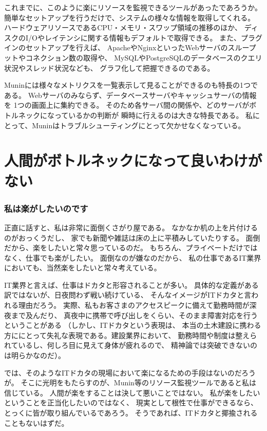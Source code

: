 これまでに、このように楽にリソースを監視できるツールがあったであろうか。
簡単なセットアップを行うだけで、システムの様々な情報を取得してくれる。
ハードウェアリソースであるCPU・メモリ・スワップ領域の推移のほか、
ディスクのI/Oやレイテンシに関する情報もデフォルトで取得できる。
また、プラグインのセットアップを行えば、
ApacheやNginxといったWebサーバのスループットやコネクション数の取得や、
MySQLやPostgreSQLのデータベースのクエリ状況やスレッド状況なども、
グラフ化して把握できるのである。

Muninには様々なメトリクスを一覧表示して見ることができるのも特長の1つである。
Webサーバのみならず、データベースサーバやキャッシュサーバの情報を
1つの画面上に集約できる。
そのため各サーバ間の関係や、どのサーバがボトルネックになっているかの判断が
瞬時に行えるのは大きな特長である。
私にとって、Muninはトラブルシューティングにとって欠かせなくなっている。

\section{人間がボトルネックになって良いわけがない}
\subsubsection{私は楽がしたいのです}
正直に話すと、私は非常に面倒くさがり屋である。
なかなか机の上を片付けるのがおっくうだし、
家でも新聞や雑誌は床の上に平積みしていたりする。
面倒だから、楽をしたいと常々思っているのだ。
もちろん、プライベートだけではなく、仕事でも楽がしたい。
面倒なのが嫌なのだから、
私の仕事であるIT業界においても、当然楽をしたいと常々考えている。

IT業界と言えば、仕事はドカタと形容されることが多い。
具体的な定義がある訳ではないが、日夜問わず戦い続けている、
そんなイメージがITドカタと言われる理由だろう。
実際、私もお客さまのアクセスピークに備えて勤務時間が深夜まで及んだり、
真夜中に携帯で呼び出しをくらい、そのまま障害対応を行うということがある
（しかし、ITドカタという表現は、
本当の土木建設に携わる方ににとって失礼な表現である。建設業界において、
勤務時間や制度は整えられているし、何しろ目に見えて身体が疲れるので、
精神論では突破できないのは明らかなのだ）。

では、そのようなITドカタの現場において楽になるための手段はないのだろうが。
そこに光明をもたらすのが、Munin等のリソース監視ツールであると私は信じている。
人間が楽をすることは決して悪いことではない。
私が楽をしたいということを正当化したいのではなく、
現実として根性で仕事ができるなら、とっくに皆が取り組んでいるであろう。
そうであれば、ITドカタと揶揄されることもないはずだ。

